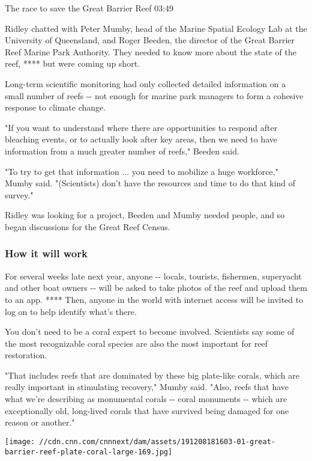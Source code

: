 The race to save the Great Barrier Reef 03:49

Ridley chatted with Peter Mumby, head of the Marine Spatial Ecology Lab
at the University of Queensland, and Roger Beeden, the director of the
Great Barrier Reef Marine Park Authority. They needed to know more about
the state of the reef, **** but were coming up short.

Long-term scientific monitoring had only collected detailed information
on a small number of reefs -\/- not enough for marine park managers to
form a cohesive response to climate change.

"If you want to understand where there are opportunities to respond
after bleaching events, or to actually look after key areas, then we
need to have information from a much greater number of reefs," Beeden
said.

"To try to get that information ... you need to mobilize a huge
workforce," Mumby said. "(Scientists) don't have the resources and time
to do that kind of survey."

Ridley was looking for a project, Beeden and Mumby needed people, and so
began discussions for the Great Reef Census.

\hypertarget{how-it-will-work}{%
\subsubsection{How it will work}\label{how-it-will-work}}

For several weeks late next year, anyone -\/- locals, tourists,
fishermen, superyacht and other boat owners -\/- will be asked to take
photos of the reef and upload them to an app. **** Then, anyone in the
world with internet access will be invited to log on to help identify
what's there.

You don't need to be a coral expert to become involved. Scientists say
some of the most recognizable coral species are also the most important
for reef restoration.

"That includes reefs that are dominated by these big plate-like corals,
which are really important in stimulating recovery," Mumby said. "Also,
reefs that have what we're describing as monumental corals -\/- coral
monuments -\/- which are exceptionally old, long-lived corals that have
survived being damaged for one reason or another."

\texttt{[image: //cdn.cnn.com/cnnnext/dam/assets/191208181603-01-great-barrier-reef-plate-coral-large-169.jpg]}

